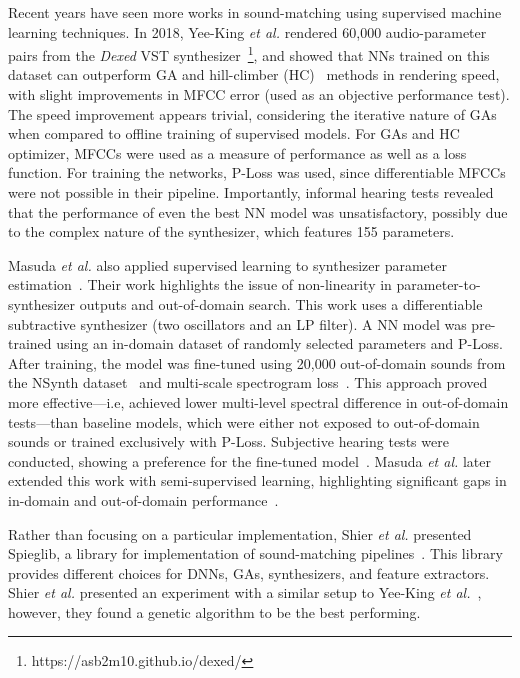 Recent years have seen more works in sound-matching using supervised machine learning techniques. In 2018, Yee-King \textit{et al.} rendered 60,000 audio-parameter pairs from the \textit{Dexed} \gls{VST} synthesizer~\footnote{https://asb2m10.github.io/dexed/}, and showed that NNs trained on this dataset can outperform GA and hill-climber (\gls{HC})~\cite{hoffmann2000heuristic} methods in rendering speed, with slight improvements in MFCC error (used as an objective performance test). The speed improvement appears trivial, considering the iterative nature of GAs when compared to offline training of supervised models. For GAs and HC optimizer, MFCCs were used as a measure of performance as well as a loss function. For training the networks, P-Loss was used, since differentiable MFCCs were not possible in their pipeline. Importantly, informal hearing tests revealed that the performance of even the best NN model was unsatisfactory, possibly due to the complex nature of the synthesizer, which features 155 parameters.

Masuda \textit{et al.} also applied supervised learning to synthesizer parameter estimation~\cite{masuda2021soundmatch}. Their work highlights the issue of non-linearity in parameter-to-synthesizer outputs and out-of-domain search. This work uses a differentiable subtractive synthesizer (two oscillators and an LP filter). A NN model was pre-trained using an in-domain dataset of randomly selected parameters and P-Loss. After training, the model was fine-tuned using 20,000 out-of-domain sounds from the NSynth dataset~\cite{engel2017neural} and multi-scale spectrogram loss~\cite{engel2020ddsp}. This approach proved more effective---i.e, achieved lower multi-level spectral difference in out-of-domain tests---than baseline models, which were either not exposed to out-of-domain sounds or trained exclusively with P-Loss. Subjective hearing tests were conducted, showing a preference for the fine-tuned model~\cite{masuda2021soundmatch}. Masuda \textit{et al.} later extended this work with semi-supervised learning, highlighting significant gaps in in-domain and out-of-domain performance~\cite{masuda2023improving}.

Rather than focusing on a particular implementation, Shier \textit{et al.} presented Spieglib, a library for implementation of sound-matching pipelines~\cite{shier2020spiegelib}. This library provides different choices for DNNs, GAs, synthesizers, and feature extractors. Shier \textit{et al.} presented an experiment with a similar setup to Yee-King \textit{et al.}~\cite{yee2018automatic}, however, they found a genetic algorithm to be the best performing.

